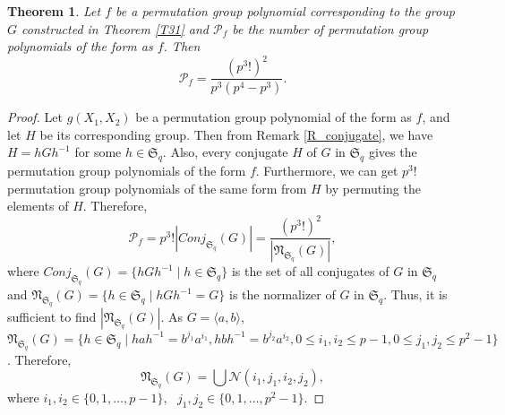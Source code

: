\documentclass[11pt]{amsart}
\theoremstyle{plain}
\newtheorem{thm}{Theorem}[section]
\numberwithin{equation}{section}
\begin{document}
\begin{thm}\label{Enumeration_T31}
Let $f$ be a permutation group polynomial corresponding to the group $G$ constructed in Theorem \ref{T31} and $\mathcal{P}_{f}$ be the number of permutation group polynomials of the form as $f$. Then
\[
\mathcal{P}_{f}=\dfrac{(p^3!)^2}{p^3(p^4-p^3)}.
\] 
\end{thm}
\begin{proof}
Let $g(X_1, X_2)$ be a permutation group polynomial of the form as $f$, and let $H$ be its corresponding group. Then from Remark \ref{R_conjugate},  we have $H = hGh^{-1}$ for some $h \in \mathfrak{S}_q$. Also, every conjugate $H$ of $G$ in $\mathfrak{S}_q$ gives the permutation group polynomials of the form $f$. Furthermore, we can get $p^3!$ permutation group polynomials of the same form from $H$ by permuting the elements of $H$. Therefore,
\[
\mathcal{P}_{f}= p^3!|Conj_{\mathfrak{S}_q}(G)|=\dfrac{(p^3!)^2}{|\mathfrak{N}_{\mathfrak{S}_q}(G)|},
\]
where $Conj_{\mathfrak{S}_q}(G)=\{hGh^{-1} \mid h \in \mathfrak{S}_q\}$ is the set of all conjugates of $G$ in $\mathfrak{S}_q$ and $\mathfrak{N}_{\mathfrak{S}_q}(G)=\{h \in \mathfrak{S}_q \mid hGh^{-1}=G\}$ is the normalizer of $G$ in $\mathfrak{S}_q$. Thus, it is sufficient to find $|\mathfrak{N}_{\mathfrak{S}_q}(G)|$. As $G=\langle a,b \rangle$, $\mathfrak{N}_{\mathfrak{S}_q}(G)=\{h\in \mathfrak{S}_q \mid hah^{-1}=b^{j_1}a^{i_1}, hbh^{-1}=b^{j_2}a^{i_2}, 0 \leq i_1,i_2 \leq p-1, 0 \leq j_1,j_2 \leq p^2-1\}$.
Therefore,
\[
\mathfrak{N}_{\mathfrak{S}_q}(G)=\displaystyle \bigcup\mathcal{N}(i_1,j_1,i_2,j_2),
\]
where $i_1,i_2 \in \{0,1,\ldots,p-1\}, \text{ } j_1,j_2 \in \{0,1,\ldots,p^2-1\}$.


\end{proof}
\end{document}
